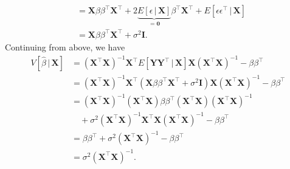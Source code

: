 \documentclass[12pt,oneside,openany]{book}
\begin{document}
\[\begin{aligned}
  &= \mathbf{X} \beta \beta^\top \mathbf{X}^\top + 2 \underbrace{E[\epsilon \,|\, \mathbf{X}]}_{= \mathbf{0}} \beta^\top \mathbf{X}^\top + E[\epsilon \epsilon^\top \,|\, \mathbf{X}] \\
  &= \mathbf{X} \beta \beta^\top \mathbf{X}^\top + \sigma^2 \mathbf{I}.
\end{aligned}
\] Continuing from above, we have \[
\begin{aligned}
  V[\hat{\beta} \,|\, \mathbf{X}]
  &= (\mathbf{X}^\top \mathbf{X})^{-1} \mathbf{X}^\top E \left[ \mathbf{Y} \mathbf{Y}^\top \,|\, \mathbf{X} \right] \mathbf{X} (\mathbf{X}^\top \mathbf{X})^{-1} - \beta \beta^\top \\
  &= (\mathbf{X}^\top \mathbf{X})^{-1} \mathbf{X}^\top ( \mathbf{X} \beta \beta^\top \mathbf{X}^\top + \sigma^2 \mathbf{I} ) \mathbf{X} (\mathbf{X}^\top \mathbf{X})^{-1} - \beta \beta^\top \\
  &= (\mathbf{X}^\top \mathbf{X})^{-1} (\mathbf{X}^\top \mathbf{X}) \beta \beta^\top (\mathbf{X}^\top \mathbf{X}) (\mathbf{X}^\top \mathbf{X})^{-1} \\ &\quad + \sigma^2 (\mathbf{X}^\top \mathbf{X})^{-1} \mathbf{X}^\top \mathbf{X} (\mathbf{X}^\top \mathbf{X})^{-1} - \beta \beta^\top \\
  &= \beta \beta^\top + \sigma^2 (\mathbf{X}^\top \mathbf{X})^{-1} - \beta \beta^\top \\
  &= \sigma^2 (\mathbf{X}^\top \mathbf{X})^{-1}.
\end{aligned}
\]
\end{document}
